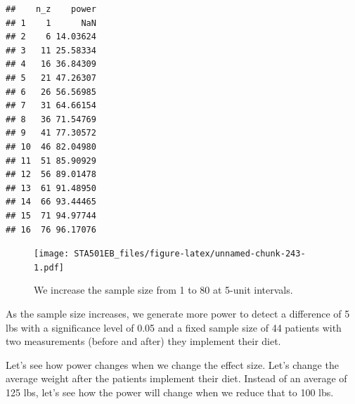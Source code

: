 \documentclass[
]{book}
\newenvironment{Shaded}{\begin{snugshade}}{\end{snugshade}}
\newcommand{\AttributeTok}[1]{\textcolor[rgb]{0.13,0.29,0.53}{#1}}
\newcommand{\DecValTok}[1]{\textcolor[rgb]{0.00,0.00,0.81}{#1}}
\newcommand{\DocumentationTok}[1]{\textcolor[rgb]{0.56,0.35,0.01}{\textbf{\textit{#1}}}}
\newcommand{\FloatTok}[1]{\textcolor[rgb]{0.00,0.00,0.81}{#1}}
\newcommand{\FunctionTok}[1]{\textcolor[rgb]{0.13,0.29,0.53}{\textbf{#1}}}
\newcommand{\NormalTok}[1]{#1}
\newcommand{\OtherTok}[1]{\textcolor[rgb]{0.56,0.35,0.01}{#1}}
\newcommand{\SpecialCharTok}[1]{\textcolor[rgb]{0.81,0.36,0.00}{\textbf{#1}}}
\newcommand{\StringTok}[1]{\textcolor[rgb]{0.31,0.60,0.02}{#1}}
\begin{document}
\begin{verbatim}
##    n_z    power
## 1    1      NaN
## 2    6 14.03624
## 3   11 25.58334
## 4   16 36.84309
## 5   21 47.26307
## 6   26 56.56985
## 7   31 64.66154
## 8   36 71.54769
## 9   41 77.30572
## 10  46 82.04980
## 11  51 85.90929
## 12  56 89.01478
## 13  61 91.48950
## 14  66 93.44465
## 15  71 94.97744
## 16  76 96.17076
\end{verbatim}

\begin{Shaded}
\end{Shaded}

\begin{figure}
\centering
\texttt{[image: STA501EB\_files/figure-latex/unnamed-chunk-243-1.pdf]}
\caption{\label{fig:unnamed-chunk-243}We increase the sample size from 1 to 80 at 5-unit intervals.}
\end{figure}

As the sample size increases, we generate more power to detect a difference of 5 lbs with a significance level of 0.05 and a fixed sample size of 44 patients with two measurements (before and after) they implement their diet.

Let's see how power changes when we change the effect size. Let's change the average weight after the patients implement their diet. Instead of an average of 125 lbs, let's see how the power will change when we reduce that to 100 lbs.

\begin{Shaded}
\end{Shaded}
\end{document}
